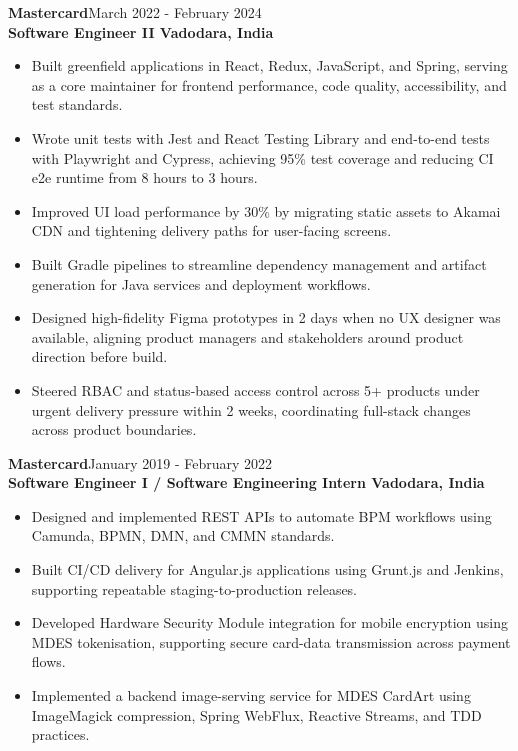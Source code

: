 \documentclass[10pt,a4paper]{article}
\newcommand{\entry}[4]{%
  \textbf{\color{secondarycolor}#1}\hfill {\small\color{mutedcolor}#2}\\
  \textbf{#3}\hfill {\small\color{mutedcolor}#4}\\[-5pt]
}
\begin{document}
\entry{Mastercard}{March 2022 - February 2024}{Software Engineer II \textbar{} Vadodara, India}{}
\begin{itemize}
  \item Built greenfield applications in React, Redux, JavaScript, and Spring, serving as a core maintainer for frontend performance, code quality, accessibility, and test standards.
  \item Wrote unit tests with Jest and React Testing Library and end-to-end tests with Playwright and Cypress, achieving 95\% test coverage and reducing CI e2e runtime from 8 hours to 3 hours.
  \item Improved UI load performance by 30\% by migrating static assets to Akamai CDN and tightening delivery paths for user-facing screens.
  \item Built Gradle pipelines to streamline dependency management and artifact generation for Java services and deployment workflows.
  \item Designed high-fidelity Figma prototypes in 2 days when no UX designer was available, aligning product managers and stakeholders around product direction before build.
  \item Steered RBAC and status-based access control across 5+ products under urgent delivery pressure within 2 weeks, coordinating full-stack changes across product boundaries.
\end{itemize}

\entry{Mastercard}{January 2019 - February 2022}{Software Engineer I / Software Engineering Intern \textbar{} Vadodara, India}{}
\begin{itemize}
  \item Designed and implemented REST APIs to automate BPM workflows using Camunda, BPMN, DMN, and CMMN standards.
  \item Built CI/CD delivery for Angular.js applications using Grunt.js and Jenkins, supporting repeatable staging-to-production releases.
  \item Developed Hardware Security Module integration for mobile encryption using MDES tokenisation, supporting secure card-data transmission across payment flows.
  \item Implemented a backend image-serving service for MDES CardArt using ImageMagick compression, Spring WebFlux, Reactive Streams, and TDD practices.
\end{itemize}
\end{document}

